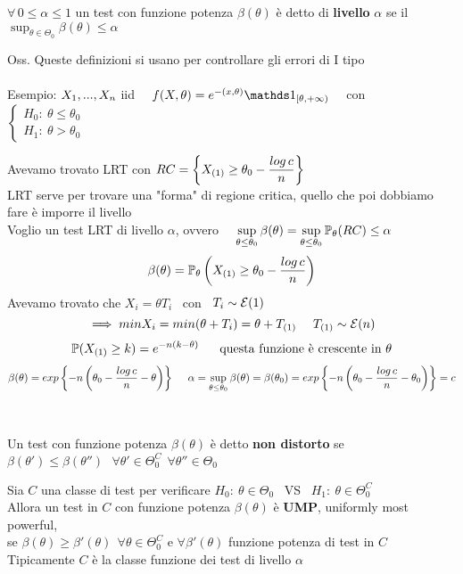 \begin{defi}
    $\forall \, 0\le \alpha\le 1 $ un test con funzione potenza $\beta(\theta)$ è detto di \textbf{livello} $\alpha$ se il $\displaystyle \sup_{\theta\in\Theta_0} \beta(\theta)\le\alpha$
\end{defi}

Oss. Queste definizioni si usano per controllare gli errori di I tipo\\ \\

Esempio: $X_1,...,X_n $ iid \ \ $f(X,\theta) = e^{-(x,\theta)} \II_{[\theta,+\infty)}$ \ \ con \ \ $\begin{cases}
    H_0 : \ \theta\le \theta_0\\
    H_1 : \ \theta>\theta_0
\end{cases}$

Avevamo trovato LRT  con  $RC = \left\{ X_{(1)}\ge \theta_0 - \dfrac{log \, c}{n} \right\}$ \\

LRT serve per trovare una "forma" di regione critica, quello che poi dobbiamo fare è imporre il livello\\

Voglio un test LRT di livello $\alpha$, ovvero \ \ $\displaystyle \sup_{\theta\le \theta_0} \beta(\theta) = \sup_{\theta\le \theta_0} \mathbb P_{\theta}(RC) \le \alpha$
\[
\beta(\theta)= \mathbb P_{\theta} \left( X_{(1)}\ge \theta_0 -\dfrac{log\, c}{n} \right)
\]
Avevamo trovato che $X_i = \theta T_i$ \ con \ $T_i\sim \mathcal E (1)$
\[
\implies min X_i = min (\theta +T_i)= \theta + T_{(1)} \ \ \ \ T_{(1)}\sim \mathcal E(n)
\]
\[
\PP(X_{(1)}\ge k) = e^{-n(k-\theta)} \ \ \ \ \text{ questa funzione è crescente in } \theta
\]
\[
\beta(\theta)= exp\left\{-n\left(\theta_0 -\dfrac{log\, c}{n} -\theta\right)\right\} \ \ \ \ \alpha=\sup_{\theta\le\theta_0} \beta(\theta) = \beta(\theta_0) = exp\left\{-n\left(\theta_0 -\dfrac{log\, c}{n} -\theta_0\right)\right\} = c
 \]

\phantom{}\\

\begin{defi}
    Un test con funzione potenza $\beta(\theta)$ è detto \textbf{non distorto} se \ \ $\beta(\theta')\le\beta(\theta'') \ \ \ \forall \theta'\in \Theta_0^C \ \ \forall \theta''\in\Theta_0$
\end{defi}



\begin{defi}
    Sia $C$ una classe di test per verificare $H_0: \ \theta\in \Theta_0$ \ VS \ $H_1: \ \theta\in\Theta_0^C$\\
    Allora un test in $C$ con funzione potenza $\beta(\theta)$ è \textbf{UMP}, uniformly most powerful,\\ se $\beta(\theta)\ge\beta'(\theta) \ \ \forall \theta\in\Theta_0^C$ e $\forall\beta'(\theta)$ funzione potenza di test in $C$\\
    Tipicamente $C$ è la classe funzione dei test di livello $\alpha$
\end{defi}

